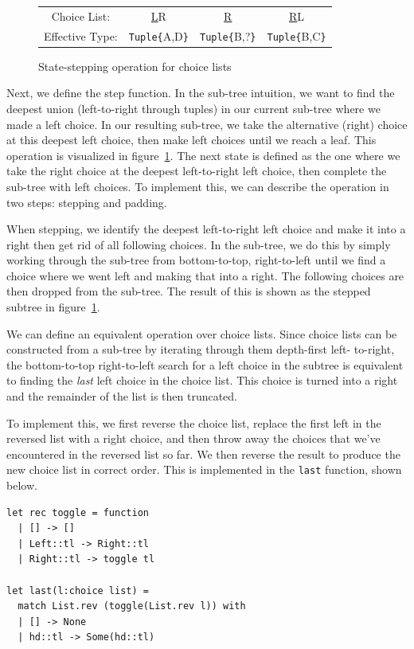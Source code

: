 \documentclass[a4paper,english]{lipics-v2019}
\newcommand{\xt}[1]{\texttt{#1}}
\newcommand{\tuple}[1]{\xt{Tuple\{}#1\xt{\}}}
\begin{document}
\begin{figure}
\begin{tabularx}{\linewidth}{c|ccc}
Choice List: & \underline{L}R & \underline{R} & \underline{R}L \\
Effective Type: & \tuple{A,D} & \tuple{B,?} & \tuple{B,C} \\
\end{tabularx}
\caption{State-stepping operation for choice lists}
\label{fig:sstep}
\end{figure}

Next, we define the step function. In the sub-tree intuition, we want to find
the deepest union (left-to-right through tuples) in our current sub-tree where
we made a left choice. In our resulting sub-tree, we take the alternative
(right) choice at this deepest left choice, then make left choices until we
reach a leaf. This operation is visualized in figure~\ref{fig:sstep}. The next
state is defined as the one where we take the right choice at the deepest left-to-right
left choice, then complete the sub-tree with left choices. To implement this,
we can describe the operation in two steps: stepping and padding.

When stepping, we identify the deepest left-to-right left choice and make it
into a right then get rid of all following choices. In the sub-tree, we do
this by simply working through the sub-tree from bottom-to-top, right-to-left
until we find a choice where we went left and making that into a right. The
following choices are then dropped from the sub-tree. The result of this is
shown as the stepped subtree in figure~\ref{fig:sstep}.

We can define an equivalent operation over choice lists. Since choice lists
can be constructed from a sub-tree by iterating through them depth-first left-
to-right, the bottom-to-top right-to-left search for a left choice in the
subtree is equivalent to finding the \emph{last} left choice in the choice
list. This choice is turned into a right and the remainder of the list is then
truncated.

To implement this, we first reverse the choice list, replace the first left
in the reversed list with a right choice, and then throw away the choices that
we've encountered in the reversed list so far. We then reverse the result to
produce the new choice list in correct order. This is implemented in the
\verb|last| function, shown below.


\begin{lstlisting}
let rec toggle = function
  | [] -> []    
  | Left::tl -> Right::tl
  | Right::tl -> toggle tl

let last(l:choice list) =
  match List.rev (toggle(List.rev l)) with
  | [] -> None
  | hd::tl -> Some(hd::tl)
\end{lstlisting}
\end{document}
